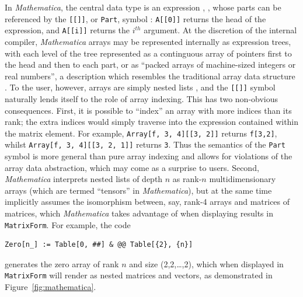 \documentclass[preprint]{sigplanconf}
\newcommand{\Mathematica}{\textit{Mathematica}}
\newcommand{\code}[1]{\texttt{#1}}
\begin{document}
In \Mathematica, the central data type is an expression \cite{mathematica:expr},
\url{}, whose parts can be referenced by the \code{[[]]}, or \code{Part}, symbol \cite{mathematica:part}: \code{A[[0]]} returns the head of the expression, and \code{A[[i]]} returns the $i^{th}$ argument. At the discretion of the internal compiler, \Mathematica{} arrays may be represented internally as expression trees, with each level of the tree represented as a continguous array of pointers first to the head and then to each part, or as ``packed arrays of machine-sized integers or real numbers'', a description which resembles the traditional array data structure \cite{mathematica:int}. To the user, however, arrays are simply nested lists \cite{mathematica:nl}, and the \code{[[]]} symbol naturally lends itself to the role of array indexing. This has two non-obvious consequences. First, it is possible to ``index'' an array with more indices than its rank; the extra indices would simply traverse into the expression contained within the matrix element. For example, \code{Array[f, {3, 4}][[3, 2]]} returns \code{f[3,2]}, whilst \code{Array[f, {3, 4}][[3, 2, 1]]} returns \code{3}. Thus the semantics of the \code{Part} symbol is more general than pure array indexing and allows for violations of the array data abstraction, which may come as a surprise to users. Second, \Mathematica{} interprets nested lists of depth $n$ as rank-$n$ multidimensionary arrays (which are termed ``tensors'' in \Mathematica), but at the same time implicitly assumes the isomorphism between, say, rank-4 arrays and matrices of matrices, which \Mathematica{} takes advantage of when displaying results in \code{MatrixForm}. For example, the code 
\begin{verbatim}
Zero[n_] := Table[0, ##] & @@ Table[{2}, {n}]
\end{verbatim}
generates the zero array of rank $n$ and size (2,2,\dots,2), which when displayed in \code{MatrixForm} will render as nested matrices and vectors, as demonstrated in Figure~\ref{fig:mathematica}.
\end{document}
